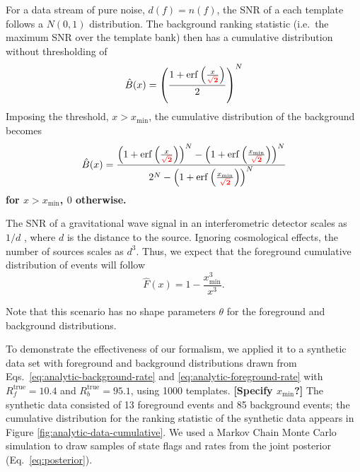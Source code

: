 \documentclass[aps,prd]{revtex4-1}
\newcommand{\xmin}{x_\mathrm{min}}
\newcommand{\ilya}[1]{{\color{red} \bf #1}}
\DeclareMathOperator{\erf}{erf}
\begin{document}
For a data stream of pure noise, $d(f) = n(f)$, the SNR of a each
template follows a $N(0,1)$ distribution.  The background ranking
statistic (i.e.\ the maximum SNR over the template bank) then has a
cumulative distribution without thresholding of
\begin{equation}
  \hat{B}(x) = \left( \frac{1 + \erf\left( \frac{x}{\ilya{\sqrt{2}}}
      \right)}{2} \right)^N
\end{equation}
Imposing the threshold, $x > \xmin$, the
cumulative distribution of the background becomes
\begin{equation}
  \label{eq:analytic-background-rate}
  \hat{B}(x) = \frac{\left( 1 + \erf\left( \frac{x}{\ilya{\sqrt{2}}} \right)
    \right)^N - \left( 1 + \erf\left( \frac{\xmin}{\ilya{\sqrt{2}}} \right)
    \right)^N}{2^N - \left( 1 + \erf\left( \frac{\xmin}{\ilya{\sqrt{2}}} \right)
    \right)^N }
\end{equation}
\ilya{for $x>\xmin$, $0$ otherwise.}

The SNR of a gravitational wave signal in an interferometric detector
scales as $1/d$ \citep{Finn1992}, where $d$ is the distance to the
source.  Ignoring cosmological effects, the number of sources scales
as $d^3$.  Thus, we expect that the foreground cumulative distribution
of events will follow
\begin{equation}
  \label{eq:analytic-foreground-rate}
  \hat{F}(x) = 1 - \frac{\xmin^3}{x^3}.
\end{equation}

Note that this scenario has no shape parameters $\theta$ for the foreground and
background distributions.

To demonstrate the effectiveness of our formalism, we applied it to a
synthetic data set with foreground and background distributions drawn
from Eqs.~\eqref{eq:analytic-background-rate} and
\eqref{eq:analytic-foreground-rate} with $R_f^\mathrm{true} = 10.4$
and $R_b^\mathrm{true} = 95.1$, using 1000 templates.  \ilya{[Specify
    $\xmin$?]} The synthetic data consisted of 13 foreground events
and 85 background events; the cumulative distribution for the ranking
statistic of the synthetic data appears in Figure
\ref{fig:analytic-data-cumulative}.  We used a Markov Chain Monte
Carlo simulation to draw samples of state flags and rates from the
joint posterior (Eq.~\eqref{eq:posterior}).
\end{document}
